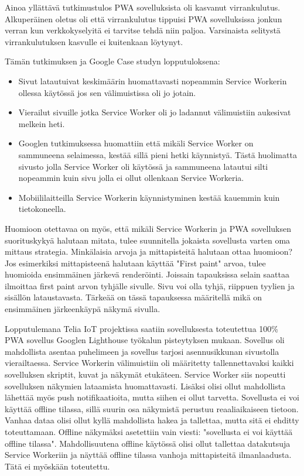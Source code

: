 \documentclass{tktltiki}
\begin{document}
Ainoa yllättävä tutkimustulos PWA sovelluksista oli kasvanut virrankulutus. Alkuperäinen oletus oli että virrankulutus tippuisi PWA sovelluksissa jonkun verran kun verkkokyselyitä ei tarvitse tehdä niin paljoa. Varsinaista selitystä virrankulutuksen kasvulle ei kuitenkaan löytynyt. 

Tämän tutkimuksen ja Google Case studyn lopputuloksena:

\begin{itemize}
  \item Sivut latautuivat keskimäärin huomattavasti nopeammin Service Workerin ollessa käytössä jos sen välimuistissa oli jo jotain.
  \item Vierailut sivuille jotka Service Worker oli jo ladannut välimuistiin aukesivat melkein heti.
  \item Googlen tutkimuksessa huomattiin että mikäli Service Worker on sammuneena selaimessa, kestää sillä pieni hetki käynnistyä. Tästä huolimatta sivusto jolla Service Worker oli käytössä ja sammuneena latautui silti nopeammin kuin sivu jolla ei ollut ollenkaan Service Workeria.
  \item Mobiililaitteilla Service Workerin käynnistyminen kestää kauemmin kuin tietokoneella.
\end{itemize}

Huomioon otettavaa on myös, että mikäli Service Workerin ja PWA sovelluksen suorituskykyä halutaan mitata, tulee suunnitella jokaista sovellusta varten oma mittaus strategia. Minkälaisia arvoja ja mittapisteitä halutaan ottaa huomioon? Jos esimerkiksi mittapisteenä halutaan käyttää "First paint" arvoa, tulee huomioida ensimmäinen järkevä renderöinti. Joissain tapauksissa selain saattaa ilmoittaa first paint arvon tyhjälle sivulle. Sivu voi olla tyhjä, riippuen tyylien ja sisällön lataustavasta. Tärkeää on tässä tapauksessa määritellä mikä on ensimmäinen järkeenkäypä näkymä sivulla.  

Lopputulemana Telia IoT projektissa saatiin sovelluksesta toteutettua 100\% PWA sovellus Googlen Lighthouse työkalun pisteytyksen mukaan. Sovellus oli mahdollista asentaa puhelimeen ja sovellus tarjosi asennusikkunan sivustolla vierailtaessa. Service Workerin välimuistiin oli määritetty tallennettavaksi kaikki sovelluksen skriptit, kuvat ja näkymät etukäteen. Service Worker siis nopeutti sovelluksen näkymien lataamista huomattavasti. Lisäksi olisi ollut mahdollista lähettää myös push notifikaatioita, mutta siihen ei ollut tarvetta. Sovellusta ei voi käyttää offline tilassa, sillä suurin osa näkymistä perustuu reaaliaikaiseen tietoon. Vanhaa dataa olisi ollut kyllä  mahdollista hakea ja tallettaa, mutta sitä ei ehditty toteuttamaan. Offline näkymäksi asetettiin vain viesti: "sovellusta ei voi käyttää offline tilassa". Mahdollisuutena offline käytössä olisi ollut tallettaa datakutsuja Service Workeriin ja näyttää offline tilassa vanhoja mittapisteitä ilmanlaadusta. Tätä ei myöskään toteutettu.
\end{document}
